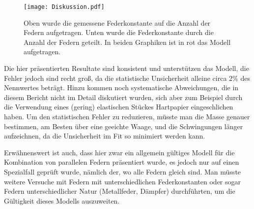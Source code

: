 \begin{figure}[H]
	\centering
	\texttt{[image: Diskussion.pdf]}
	\caption[Vergleich der Federkonstanten als normalisierte Gaußkurven]{Oben wurde die gemessene Federkonstante auf die Anzahl der Federn aufgetragen. Unten wurde die Federkonstante durch die Anzahl der Federn geteilt. In beiden Graphiken ist in rot das Modell aufgetragen.}
	\label{fig:Diskusisons}
\end{figure}

Die hier präsentierten Resultate sind konsistent und unterstützen das Modell, die Fehler jedoch sind recht groß, da die statistische Unsicherheit alleine circa \( 2 \% \) des Nennwertes beträgt. Hinzu kommen noch systematische Abweichungen, die in diesem Bericht nicht im Detail diskutiert wurden, sich aber zum Beispiel durch die Verwendung eines (gering) elastischen Stückes Hartpapier eingeschlichen haben. Um den statistischen Fehler zu reduzieren, müsste man die Masse genauer bestimmen, am Besten über eine geeichte Waage, und die Schwingungen länger aufzeichnen, da die Unsicherheit im Fit so minimiert werden kann.

Erwähnenswert ist auch, dass hier zwar ein allgemein gültiges Modell für die Kombination von parallelen Federn präsentiert wurde, es jedoch nur auf einen Spezialfall geprüft wurde, nämlich der, wo alle Federn gleich sind. Man müsste weitere Versuche mit Federn mit unterschiedlichen Federkonstanten oder sogar Federn unterschiedlicher Natur (Metallfeder, Dämpfer) durchführten, um die Gültigkeit dieses Modells auszuweiten. 


